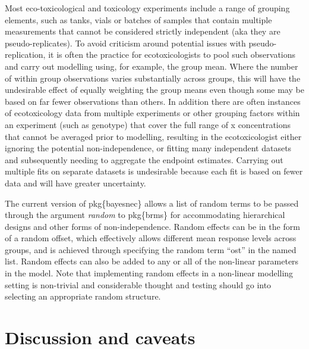 \documentclass[
]{jss}
\begin{document}
Most eco-toxicological and toxicology experiments include a range of
grouping elements, such as tanks, vials or batches of samples that
contain multiple measurements that cannot be considered strictly
independent (aka they are pseudo-replicates). To avoid criticism around
potential issues with pseudo-replication, it is often the practice for
ecotoxicologists to pool such observations and carry out modelling
using, for example, the group mean. Where the number of within group
observations varies substantially across groups, this will have the
undesirable effect of equally weighting the group means even though some
may be based on far fewer observations than others. In addition there
are often instances of ecotoxicology data from multiple experiments or
other grouping factors within an experiment (such as genotype) that
cover the full range of x concentrations that cannot be averaged prior
to modelling, resulting in the ecotoxicologist either ignoring the
potential non-independence, or fitting many independent datasets and
subsequently needing to aggregate the endpoint estimates. Carrying out
multiple fits on separate datasets is undesirable because each fit is
based on fewer data and will have greater uncertainty.

The current version of pkg\{bayesnec\} allows a list of random terms to
be passed through the argument \emph{random} to pkg\{brms\} for
accommodating hierarchical designs and other forms of non-independence.
Random effects can be in the form of a random offset, which effectively
allows different mean response levels across groups, and is achieved
through specifying the random term ``ost'' in the named list. Random
effects can also be added to any or all of the non-linear parameters in
the model. Note that implementing random effects in a non-linear
modelling setting is non-trivial and considerable thought and testing
should go into selecting an appropriate random structure.

\hypertarget{discussion-and-caveats}{%
\section{Discussion and caveats}\label{discussion-and-caveats}}
\end{document}

